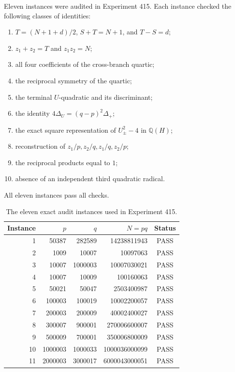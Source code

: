 \documentclass[11pt,a4paper]{article}
\theoremstyle{definition}
\theoremstyle{remark}
\newcommand{\Q}{\mathbb{Q}}
\begin{document}
Eleven instances were audited in Experiment 415. Each instance checked the following classes of identities:
\begin{enumerate}[leftmargin=2em]
  \item $T=(N+1+d)/2$, $S+T=N+1$, and $T-S=d$;
  \item $z_1+z_2=T$ and $z_1z_2=N$;
  \item all four coefficients of the cross-branch quartic;
  \item the reciprocal symmetry of the quartic;
  \item the terminal $U$-quadratic and its discriminant;
  \item the identity $4\Delta_U=(q-p)^2\Delta_+$;
  \item the exact square representation of $U_\pm^2-4$ in $\Q(H)$;
  \item reconstruction of $z_1/p,z_2/q,z_1/q,z_2/p$;
  \item the reciprocal products equal to $1$;
  \item absence of an independent third quadratic radical.
\end{enumerate}

All eleven instances pass all checks.

\begin{table}[h]
\centering
\caption{The eleven exact audit instances used in Experiment 415.}
\begin{tabular}{r|r|r|r|c}
\toprule
Instance & $p$ & $q$ & $N=pq$ & Status\\
\midrule
1 & 50387 & 282589 & 14238811943 & PASS\\
2 & 1009 & 10007 & 10097063 & PASS\\
3 & 10007 & 1000003 & 10007030021 & PASS\\
4 & 10007 & 10009 & 100160063 & PASS\\
5 & 50021 & 50047 & 2503400987 & PASS\\
6 & 100003 & 100019 & 10002200057 & PASS\\
7 & 200003 & 200009 & 40002400027 & PASS\\
8 & 300007 & 900001 & 270006600007 & PASS\\
9 & 500009 & 700001 & 350006800009 & PASS\\
10 & 1000003 & 1000033 & 1000036000099 & PASS\\
11 & 2000003 & 3000017 & 6000043000051 & PASS\\
\bottomrule
\end{tabular}
\end{table}
\end{document}
